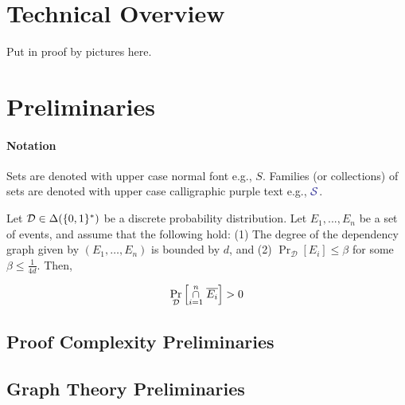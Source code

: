 \documentclass[11pt]{article}
\newcommand{\DistSet}[1]{\Delta(#1)}
\newcommand{\Dist}{\mathcal{D}}
\newcommand{\PProb}[2]{\Pr_{#2}\left[#1 \right]}
\begin{document}
\section{Technical Overview}

Put in proof by pictures here.



\section{Preliminaries}
\label{sec:prelims}

\paragraph{Notation} Sets are denoted with upper case normal font e.g., $S$. Families (or collections) of sets are denoted with upper case calligraphic purple text e.g., $\Family{S}$. 


\begin{definition}\label{def:dep-graphs}
	
\end{definition}

\begin{lemma}\label{lemma:lll}Let $\Dist \in \DistSet{\bit^*}$ be a discrete probability distribution.
Let $E_1,...,E_n$ be a set of events, and assume that the following hold: (1) The degree of the dependency graph given by $(E_1, \dots, E_n)$ is bounded by $d$, and (2) $\PProb{E_i}{\Dist} \leq \beta$ for some $\beta \leq \frac{1}{4d}$. Then,

\[ \PProb{\overset{n}{ \underset{i=1}{\cap}} \hspace{0.1cm}  \overline{E_i}}{\Dist} > 0\]	
	
\end{lemma}

\subsection{Proof Complexity Preliminaries}
\label{sec:proof-system-prelims}
\begin{definition}\label{def:poly-calc-refutations}
	
\end{definition}

\subsection{Graph Theory Preliminaries}
\end{document}
